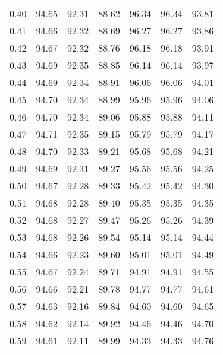 \begin{tabular}{|c|c|c|c|c|c|c|}
      0.40 &     94.65 &     92.31 &      88.62 &   96.34 &      96.34 &         93.81 \\
      0.41 &     94.66 &     92.32 &      88.69 &   96.27 &      96.27 &         93.86 \\
      0.42 &     94.67 &     92.32 &      88.76 &   96.18 &      96.18 &         93.91 \\
      0.43 &     94.69 &     92.35 &      88.85 &   96.14 &      96.14 &         93.97 \\
      0.44 &     94.69 &     92.34 &      88.91 &   96.06 &      96.06 &         94.01 \\
      0.45 &     94.70 &     92.34 &      88.99 &   95.96 &      95.96 &         94.06 \\
      0.46 &     94.70 &     92.34 &      89.06 &   95.88 &      95.88 &         94.11 \\
      0.47 &     94.71 &     92.35 &      89.15 &   95.79 &      95.79 &         94.17 \\
      0.48 &     94.70 &     92.33 &      89.21 &   95.68 &      95.68 &         94.21 \\
      0.49 &     94.69 &     92.31 &      89.27 &   95.56 &      95.56 &         94.25 \\
      0.50 &     94.67 &     92.28 &      89.33 &   95.42 &      95.42 &         94.30 \\
      0.51 &     94.68 &     92.28 &      89.40 &   95.35 &      95.35 &         94.35 \\
      0.52 &     94.68 &     92.27 &      89.47 &   95.26 &      95.26 &         94.39 \\
      0.53 &     94.68 &     92.26 &      89.54 &   95.14 &      95.14 &         94.44 \\
      0.54 &     94.66 &     92.23 &      89.60 &   95.01 &      95.01 &         94.49 \\
      0.55 &     94.67 &     92.24 &      89.71 &   94.91 &      94.91 &         94.55 \\
      0.56 &     94.66 &     92.21 &      89.78 &   94.77 &      94.77 &         94.61 \\
      0.57 &     94.63 &     92.16 &      89.84 &   94.60 &      94.60 &         94.65 \\
      0.58 &     94.62 &     92.14 &      89.92 &   94.46 &      94.46 &         94.70 \\
      0.59 &     94.61 &     92.11 &      89.99 &   94.33 &      94.33 &         94.76 \\

\end{tabular}
